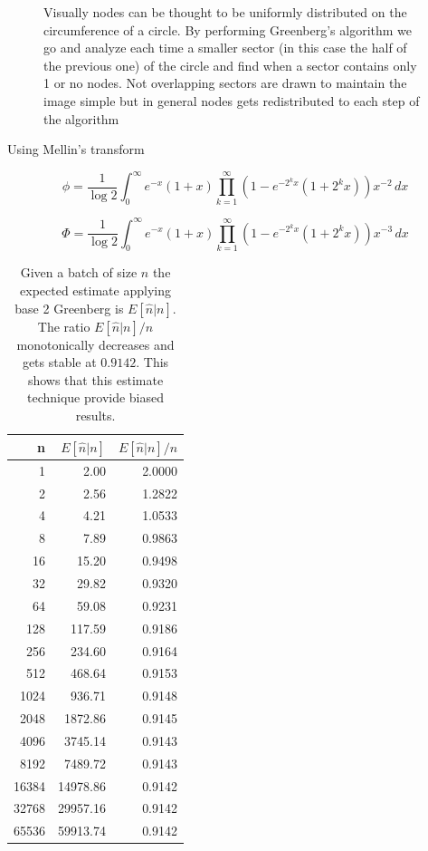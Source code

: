 \documentclass[12pt,a4paper,twocolumns]{report}
\begin{document}
\begin{figure}[htb!]
\begin{tikzpicture}[scale=0.9]
    \end{tikzpicture}
    \caption[Basic greenberg batch split idea]{Visually nodes can be thought to be uniformly distributed on the circumference of a circle. By performing Greenberg's algorithm we go and analyze each time a smaller sector (in this case the half of the previous one) of the circle and find when a sector contains only 1 or no nodes.  Not overlapping sectors are drawn to maintain the image simple but in general nodes gets redistributed to each step of the algorithm}
    \label{fig:sp2d}
\end{figure}

Using Mellin's transform 

\begin{equation}
\phi= \frac{1}{\log2} \int_{0}^{\infty} \! e^{-x}(1+x) \prod_{k=1}^{\infty}(1-e^{-2^{k}x}(1+2^{k}x))x^{-2} \, dx
\end{equation}

\begin{equation}
\Phi= \frac{1}{\log2} \int_{0}^{\infty} \! e^{-x}(1+x) \prod_{k=1}^{\infty}(1-e^{-2^{k}x}(1+2^{k}x))x^{-3} \, dx
\end{equation}

\begin{table}[htdp]
\caption[Expected Estimate with Greenberg]{Given a batch of size $n$ the expected estimate applying base 2 Greenberg is $E[\hat{n}|n]$. The ratio $E[\hat{n}|n]/n$ monotonically decreases and gets stable at $0.9142$. This shows that this estimate technique provide biased results.}
\begin{center}
\begin{tabular}{rD{.}{.}{5.2}D{.}{.}{1.4}}
 n &  &  \\ \hline {} &     2.00 &   2.0000 \\ 
2 &     2.56 &   1.2822 \\ 
4 &     4.21 &   1.0533 \\ 
8 &     7.89 &   0.9863 \\ 
16 &  15.20 &   0.9498 \\ 
32 &    29.82 &   0.9320 \\ 
64 &    59.08 &   0.9231 \\ 
128 &   117.59 &   0.9186 \\ 
256 &   234.60 &   0.9164 \\ 
512 &   468.64 &   0.9153 \\ 
1024 &   936.71 &   0.9148 \\ 
2048 &  1872.86 &   0.9145 \\ 
4096 &  3745.14 &   0.9143 \\ 
8192 &  7489.72 &   0.9143 \\ 
16384 & 14978.86 &   0.9142 \\ 
32768 & 29957.16 &   0.9142 \\ 
65536 & 59913.74 &   0.9142 \\ 

\end{tabular}
\end{center}
\end{table}%
\end{document}
